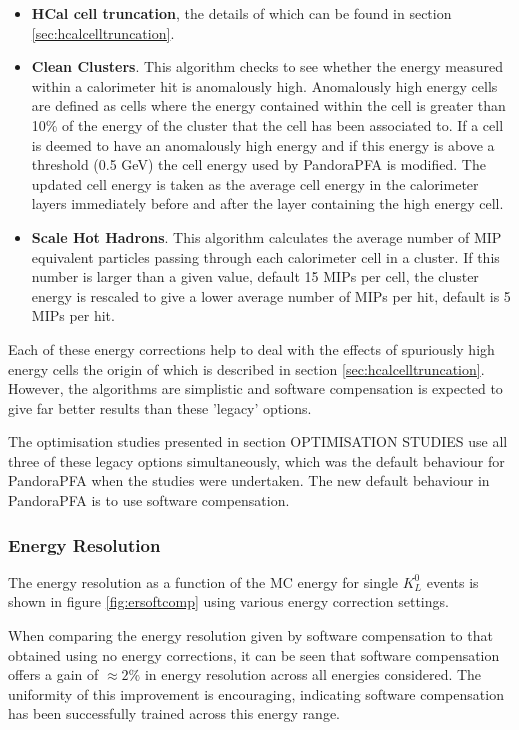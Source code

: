 \begin{itemize}
\item \textbf{HCal cell truncation}, the details of which can be found in section \ref{sec:hcalcelltruncation}.
\item \textbf{Clean Clusters}.  This algorithm checks to see whether the energy measured within a calorimeter hit is anomalously high.  Anomalously high energy cells are defined as cells where the energy contained within the cell is greater than 10\% of the energy of the cluster that the cell has been associated to.  If a cell is deemed to have an anomalously high energy and if this energy is above a threshold (0.5 GeV) the cell energy used by PandoraPFA is modified.  The updated cell energy is taken as the average cell energy in the calorimeter layers immediately before and after the layer containing the high energy cell.    
\item \textbf{Scale Hot Hadrons}.  This algorithm calculates the average number of MIP equivalent particles passing through each calorimeter cell in a cluster.  If this number is larger than a given value, default 15 MIPs per cell, the cluster energy is rescaled to give a lower average number of MIPs per hit, default is 5 MIPs per hit.  
\end{itemize}

Each of these energy corrections help to deal with the effects of spuriously high energy cells the origin of which is described in section \ref{sec:hcalcelltruncation}.  However, the algorithms are simplistic and software compensation is expected to give far better results than these 'legacy' options.  

The optimisation studies presented in section OPTIMISATION STUDIES use all three of these legacy options simultaneously, which was the default behaviour for PandoraPFA when the studies were undertaken.  The new default behaviour in PandoraPFA is to use software compensation.


\subsubsection{Energy Resolution}
\label{sec:softcomper}
The energy resolution as a function of the MC energy for single $K^{0}_{L}$ events is shown in figure \ref{fig:ersoftcomp} using various energy correction settings.  

When comparing the energy resolution given by software compensation to that obtained using no energy corrections, it can be seen that software compensation offers a gain of $\approx 2 \%$ in energy resolution across all energies considered.  The uniformity of this improvement is encouraging, indicating software compensation has been successfully trained across this energy range.   

